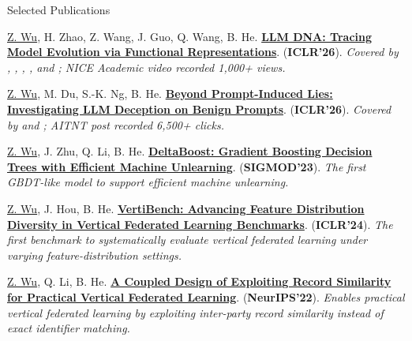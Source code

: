 \begin{rSectionTiny}{Selected Publications}{}
    {\small
        \noindent \underline{Z. Wu}, H. Zhao, Z. Wang, J. Guo, Q. Wang, B. He. {\bf \href{https://openreview.net/forum?id=UIxHaAqFqQ}{LLM DNA: Tracing Model Evolution via Functional Representations}}. ({\bf ICLR'26}).  \textit{Covered by , , , , and ; NICE Academic video recorded 1{,}000+ views.}

        \noindent \underline{Z. Wu}, M. Du, S.-K. Ng, B. He. {\bf \href{https://openreview.net/forum?id=PDBBYwd1LY}{Beyond Prompt-Induced Lies: Investigating LLM Deception on Benign Prompts}}. ({\bf ICLR'26}).  \textit{Covered by  and ; AITNT post recorded 6{,}500+ clicks.}

        \noindent \underline{Z. Wu}, J. Zhu, Q. Li, B. He. {\bf \href{https://doi.org/10.1145/3589313}{DeltaBoost: Gradient Boosting Decision Trees with Efficient Machine Unlearning}}. ({\bf SIGMOD'23}).  \textit{The first GBDT-like model to support efficient machine unlearning.}

        \noindent \underline{Z. Wu}, J. Hou, B. He. {\bf \href{https://openreview.net/forum?id=glwwbaeKm2}{VertiBench: Advancing Feature Distribution Diversity in Vertical Federated Learning Benchmarks}}. ({\bf ICLR'24}). \textit{The first benchmark to systematically evaluate vertical federated learning under varying feature-distribution settings.}

        \noindent \underline{Z. Wu}, Q. Li, B. He. {\bf \href{https://proceedings.neurips.cc/paper_files/paper/2022/file/84b744165a0597360caad96b06e69313-Paper-Conference.pdf}{A Coupled Design of Exploiting Record Similarity for Practical Vertical Federated Learning}}. ({\bf NeurIPS'22}). \textit{Enables practical vertical federated learning by exploiting inter-party record similarity instead of exact identifier matching.}
    }
\end{rSectionTiny}
